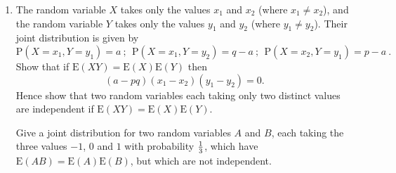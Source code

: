 \documentclass[a4, 11pt]{report}
\newlength{\qspace}
\newcounter{qnumber}
\newenvironment{question}%
 {\vspace{\qspace}
  \begin{enumerate}[\bfseries 1\quad][10]%
    \setcounter{enumi}{\value{qnumber}}%
    \item%
 }
{
  \end{enumerate}
  \filbreak
  \stepcounter{qnumber}
 }
\def\E{{\mathrm E}}
\def\P{{\mathrm P}}
\begin{document}
\begin{question}
The random variable $X$ takes  
only the values $x_1$ and $x_2$  (where $ x_1 \not= x_2 $), 
 and the random variable $Y$ takes only  
the values $y_1$ and $y_2$  (where $y_1 \not= y_2$). 
Their joint distribution is given by  
$$ 
\P ( X = x_1 , Y = y_1 ) = a \ ; \ \  
\P ( X = x_1 , Y = y_2 ) = q - a \ ; \ \  
\P ( X = x_2 , Y = y_1 ) = p - a \ . 
$$  
Show that if $\E(X Y) = \E(X)\E(Y)$ then  
$$  
(a - p q ) ( x_1 - x_2 ) ( y_1 - y_2 ) = 0 . 
$$ 
Hence show that two random variables each taking  
only two distinct values are independent if  
$\E(X Y) = \E(X) \E(Y)$. 
 
Give a  joint distribution for two random variables  
$A$ and $B$, each taking the three values $- 1$, $0$ and $1$  
with probability ${1 \over 3}$,  
which have $\E(A B) = \E( A)\E (B)$, but which are not independent. 
\end{question}
	
\end{document}
